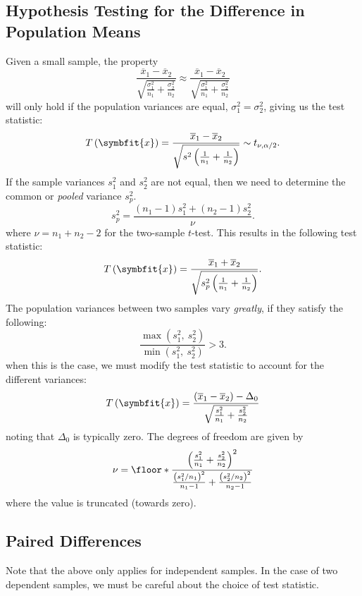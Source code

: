 \documentclass{article}
\begin{document}
\subsection{Hypothesis Testing for the Difference in Population Means}
Given a small sample, the property
\begin{equation*}
    \frac{\overline{x}_1 - \overline{x}_2}{\sqrt{\frac{\sigma_1^2}{n_1} + \frac{\sigma_2^2}{n_2}}} \approx \frac{\overline{x}_1 - \overline{x}_2}{\sqrt{\frac{\sigma_1^2}{n_1} + \frac{\sigma_2^2}{n_2}}}
\end{equation*}
will only hold if the population variances are equal, \(\sigma_1^2 = \sigma_2^2\), giving
us the test statistic:
\begin{equation*}
    T\left( \symbfit{x} \right) = \frac{\overline{x}_1 - \overline{x}_2}{\sqrt{s^2\left( \frac{1}{n_1} + \frac{1}{n_2} \right)}} \sim t_{\nu, \alpha/2}.
\end{equation*}
If the sample variances \(s_1^2\) and \(s_2^2\) are not equal, then we
need to determine the common or \textit{pooled} variance \(s_p^2\).
\begin{equation*}
    s_p^2 = \frac{\left( n_1 - 1 \right)s_1^2 + \left( n_2 - 1 \right)s_2^2}{\nu}.
\end{equation*}
where \(\nu = n_1 + n_2 - 2\) for the two-sample \(t\)-test.
This results in the following test statistic:
\begin{equation*}
    T\left( \symbfit{x} \right) = \frac{\overline{x}_1 + \overline{x}_2}{\sqrt{s_p^2 \left( \frac{1}{n_1} + \frac{1}{n_2} \right)}}.
\end{equation*}
The population variances between two samples vary \textit{greatly}, if
they satisfy the following:
\begin{equation*}
    \frac{\max{\left( s_1^2,\: s_2^2 \right)}}{\min{\left( s_1^2,\: s_2^2 \right)}} > 3.
\end{equation*}
when this is the case, we must modify the test statistic to account for the
different variances:
\begin{equation*}
    T\left( \symbfit{x} \right) = \frac{\left( \overline{x}_1 - \overline{x}_2 \right) - \Delta_0}{\sqrt{\frac{s_1^2}{n_1} + \frac{s_2^2}{n_2}}}
\end{equation*}
noting that \(\Delta_0\) is typically zero. The degrees of freedom are given by
\begin{equation*}
    \nu = \floor*{\frac{\left( \frac{s_1^2}{n_1} + \frac{s_2^2}{n_2} \right)^2}{\frac{\left( s_1^2 / n_1 \right)^2}{n_1 - 1} + \frac{\left( s_2^2 / n_2 \right)^2}{n_2 - 1}}}
\end{equation*}
where the value is truncated (towards zero).
\subsection{Paired Differences}
Note that the above only applies for independent samples.
In the case of two dependent samples, we must be careful about the choice
of test statistic.
\end{document}
